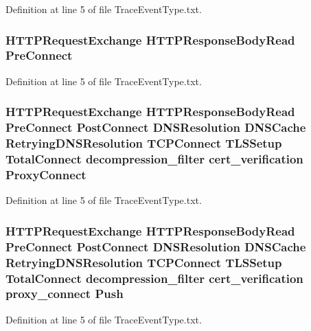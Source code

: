 Definition at line 5 of file Trace\+Event\+Type.\+txt.

\subsubsection[{Pre\+Connect}]{ H\+T\+T\+P\+Request\+Exchange H\+T\+T\+P\+Response\+Body\+Read Pre\+Connect}\label{TraceEventType_8txt_a8051704c4a685b4db969b81a948bedba}


Definition at line 5 of file Trace\+Event\+Type.\+txt.

\subsubsection[{Proxy\+Connect}]{ H\+T\+T\+P\+Request\+Exchange H\+T\+T\+P\+Response\+Body\+Read {\bf Pre\+Connect} {\bf Post\+Connect} D\+N\+S\+Resolution D\+N\+S\+Cache Retrying\+D\+N\+S\+Resolution T\+C\+P\+Connect T\+L\+S\+Setup {\bf Total\+Connect} decompression\+\_\+filter cert\+\_\+verification Proxy\+Connect}\label{TraceEventType_8txt_a57c57953dc033b42b99cf6c137df717c}


Definition at line 5 of file Trace\+Event\+Type.\+txt.

\subsubsection[{Push}]{ H\+T\+T\+P\+Request\+Exchange H\+T\+T\+P\+Response\+Body\+Read {\bf Pre\+Connect} {\bf Post\+Connect} D\+N\+S\+Resolution D\+N\+S\+Cache Retrying\+D\+N\+S\+Resolution T\+C\+P\+Connect T\+L\+S\+Setup {\bf Total\+Connect} decompression\+\_\+filter cert\+\_\+verification proxy\+\_\+connect Push}\label{TraceEventType_8txt_a2c2d83e9696b004cbbb3aacb46ebc687}


Definition at line 5 of file Trace\+Event\+Type.\+txt.


